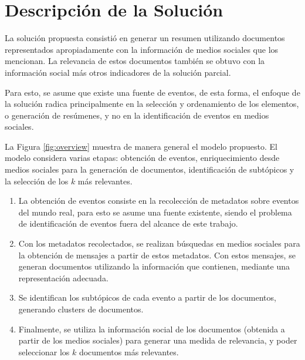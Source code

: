 

\chapter{Descripción de la Solución}
\label{sec-4}

\label{cap:solucion}

  La solución propuesta consistió en generar un resumen utilizando
  documentos representados apropiadamente con la información de medios
  sociales que los mencionan. La relevancia de estos documentos
  también se obtuvo con la información social más otros indicadores de
  la solución parcial.

  Para esto, se asume que existe una fuente de eventos, de esta forma,
  el enfoque de la solución radica principalmente en la selección y 
  ordenamiento de los elementos, o generación de resúmenes, y no en 
  la identificación de eventos en medios sociales.

  La Figura \ref{fig:overview} muestra de manera general el modelo
  propuesto. El modelo considera varias etapas: obtención de eventos,
  enriquecimiento desde medios sociales para la generación de
  documentos, identificación de subtópicos y la selección de los $k$
  más relevantes.

\begin{enumerate}
\item La obtención de eventos consiste en la recolección de metadatos
     sobre eventos del mundo real, para esto se asume una fuente
     existente, siendo el problema de identificación de eventos fuera
     del alcance de este trabajo.
\item Con los metadatos recolectados, se realizan búsquedas en medios
     sociales para la obtención de mensajes a partir de estos
     metadatos. Con estos mensajes, se generan documentos utilizando la
     información que contienen, mediante una representación adecuada.
\item Se identifican los subtópicos de cada evento a partir de los
     documentos, generando clusters de documentos.
\item Finalmente, se utiliza la información social de los documentos
     (obtenida a partir de los medios sociales) para generar una medida
     de relevancia, y poder seleccionar los $k$ documentos más
     relevantes.
\end{enumerate}

